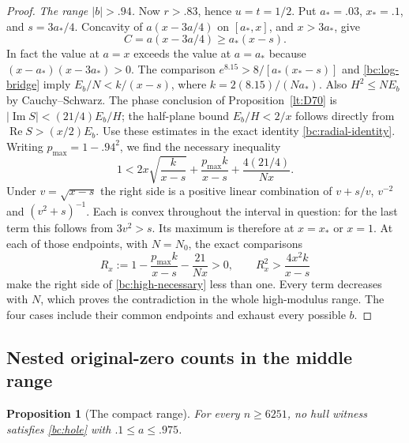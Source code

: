\documentclass[11pt,reqno]{amsart}
\numberwithin{equation}{section}
\newtheorem{proposition}[theorem]{Proposition}
\theoremstyle{definition}
\theoremstyle{remark}
\renewcommand{\Re}{\operatorname{Re}}
\renewcommand{\Im}{\operatorname{Im}}
\begin{document}
\begin{proof}
\emph{The range $|b|>.94$.}
Now $r>.83$, hence $u=t=1/2$.
Put $a_*=.03$, $x_* =.1$, and $s=3a_*/4$.
Concavity of $a(x-3a/4)$ on $[a_*,x]$, and $x>3a_*$, give
\[
 C=a(x-3a/4)\geq a_*(x-s).
\]
In fact the value at $a=x$ exceeds the value at $a=a_*$ because
$(x-a_*)(x-3a_*)>0$.
The comparison $e^{8.15}>8/[a_*(x_*-s)]$ and
\eqref{bc:log-bridge} imply
$E_b/N<k/(x-s)$, where $k=2(8.15)/(Na_*)$.
Also $H^2\leq NE_b$ by Cauchy--Schwarz.
The phase conclusion of Proposition~\ref{lt:D70} is
$|\Im S|<(21/4)E_b/H$; the half-plane bound
$E_b/H<2/x$ follows directly from $\Re S>(x/2)E_b$.
Use these estimates in the exact identity \eqref{bc:radial-identity}.
Writing $p_{\max}=1-.94^2$, we find the necessary inequality
\begin{equation}\label{bc:high-necessary}
 1<2x\sqrt{\frac{k}{x-s}}
       +\frac{p_{\max}k}{x-s}
       +\frac{4(21/4)}{Nx}.
\end{equation}
Under $v=\sqrt{x-s}$ the right side is a positive linear combination
of $v+s/v$, $v^{-2}$ and $(v^2+s)^{-1}$.
Each is convex throughout the interval in question: for the last
term this follows from $3v^2>s$.
Its maximum is therefore at $x=x_*$ or $x=1$.
At each of those endpoints, with $N=N_0$, the exact comparisons
\[
 R_x:=1-\frac{p_{\max}k}{x-s}-\frac{21}{Nx}>0,\qquad
 R_x^2>\frac{4x^2k}{x-s}
\]
make the right side of \eqref{bc:high-necessary} less than one.
Every term decreases with $N$, which proves the contradiction in
the whole high-modulus range.  The four cases include their common
endpoints and exhaust every possible $b$.
\end{proof}

\subsection{Nested original-zero counts in the middle range}

\begin{proposition}[The compact range]\label{bc:compact}
For every $n\geq6251$, no hull witness satisfies
\eqref{bc:hole} with $.1\leq a\leq.975$.
\end{proposition}
\end{document}
